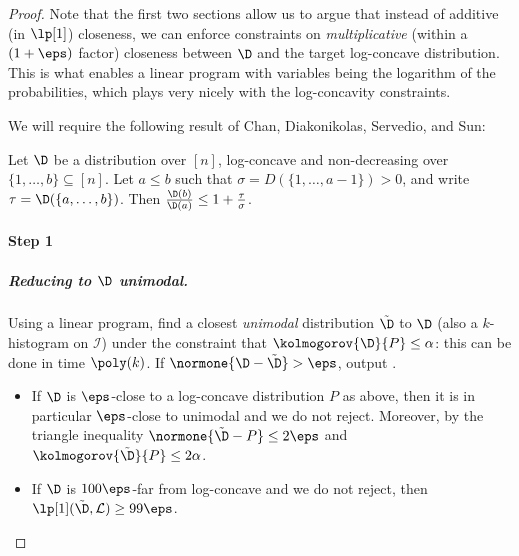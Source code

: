 \begin{proof}
Note that the first two sections allow us to argue that instead of additive (in $\lp[1]$) closeness, we can enforce constraints on \emph{multiplicative} (within a $(1+\eps)$ factor) closeness between $\D$ and the target log-concave distribution. This is what enables a linear program with variables being the logarithm of the probabilities, which plays very nicely with the log-concavity constraints. \medskip

\noindent We will require the following result of Chan, Diakonikolas, Servedio, and Sun:
\begin{theorem}\label{lemma:cdss13:41}
Let $\D$ be a distribution over $[n]$, log-concave and non-decreasing over $\{1,\dots,b\} \subseteq [n]$. Let $a\leq b$ such that
 $\sigma = D(\{1,\dots,a-1\}) > 0$, and write $\tau=\D(\{a,\dots,b\})$. Then 
 		$\frac{\D(b)}{\D(a)} \leq 1+\frac{\tau}{\sigma}$.
\end{theorem}

\paragraph{Step 1}\label{stage:1}

\subparagraph{Reducing to $\D$ unimodal.}
Using a linear program, find a closest \emph{unimodal} distribution $\tilde{\D}$ to $\D$ (also a $k$-histogram on $\mathcal{I}$) under the constraint that $\kolmogorov{\D}{P} \leq \alpha$: this can be done in time $\poly(k)$. If $\normone{\D-\tilde{\D}} > \eps$, output \reject.

\begin{itemize}
  \item If $\D$ is $\eps$-close to a log-concave distribution $P$ as above, then it is in particular $\eps$-close to unimodal and we do not reject. Moreover, by the triangle inequality $\normone{\tilde{\D} - P} \leq 2\eps$ and $\kolmogorov{\tilde{\D}}{P} \leq 2\alpha$.
  \item If $\D$ is $100\eps$-far from log-concave and we do not reject, then $\lp[1](\tilde{\D},\classlog) \geq 99\eps$.
\end{itemize}


\end{proof}
